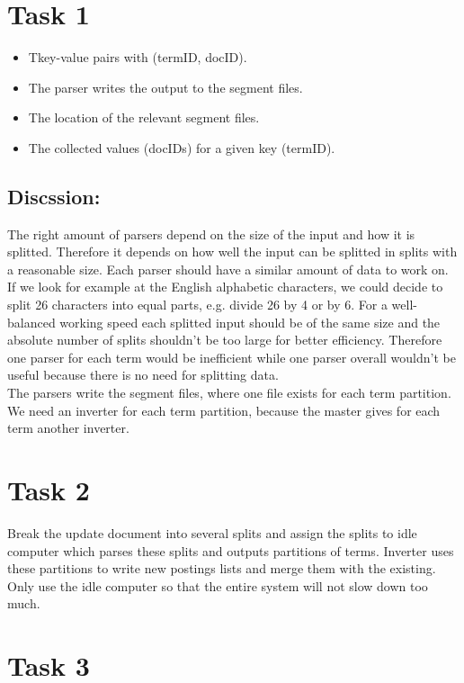 \documentclass[a4paper]{scrartcl}
\begin{document}
\section*{Task 1}
\begin{itemize}
	\item Tkey-value pairs with (termID, docID).
	\item The parser writes the output to the segment files.
	\item The location of the relevant segment files.
	\item The collected values (docIDs) for a given key (termID).
\end{itemize}
\subsection*{Discssion:}
The right amount of parsers depend on the size of the input and how it is splitted. 
Therefore it depends on how well the input can be splitted in splits with a reasonable size. Each parser should have a similar amount of data to work on.
If we look for example at the English alphabetic characters, we could decide to split 26 characters into equal parts, e.g. divide 26 by 4 or by 6.
For a well-balanced working speed each splitted input should be of the same size and the absolute number of splits shouldn't be too large for better
efficiency. Therefore one parser for each term would be inefficient while one parser overall wouldn't be useful because there is no need for splitting data.\\

The parsers write the segment files, where one file exists for each term partition. We need an inverter for each term partition, because the master
gives for each term another inverter.

\section*{Task 2}
Break the update document into several splits and assign the splits to idle computer which parses these splits and outputs partitions of terms. Inverter uses these partitions to write new postings lists and merge them with the existing.\\
Only use the idle computer so that the entire system will not slow down too much.\\

\section*{Task 3}
\end{document}
